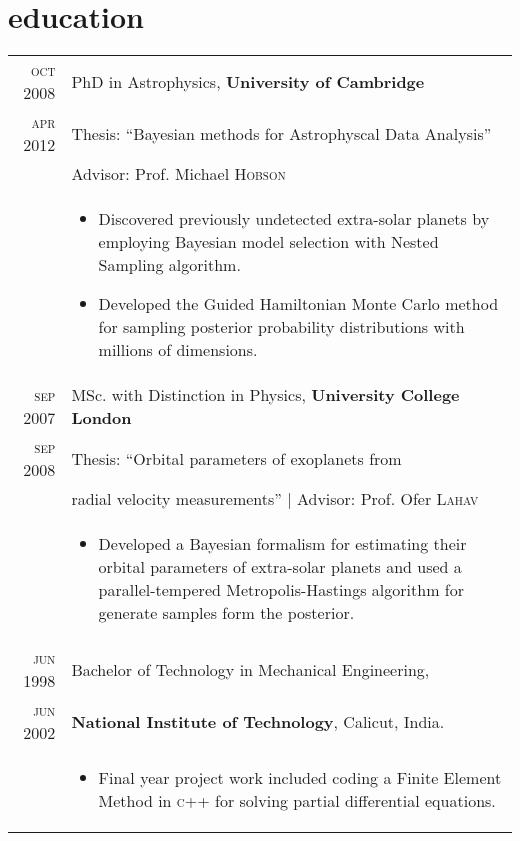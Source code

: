 \documentclass[a4paper,10pt]{article}
\begin{document}
\section{education}
\begin{tabular}{r|p{11cm}}
\textsc{oct 2008} & PhD in Astrophysics, \textbf{University of Cambridge}\\
\textsc{apr 2012} & Thesis: ``Bayesian methods for Astrophyscal Data Analysis'' \\
& \small Advisor: Prof. Michael \textsc{Hobson}\\
&\small{
  \begin{itemize}
    \item Discovered previously undetected extra-solar planets by employing Bayesian model selection
    with Nested Sampling algorithm.
    \item Developed the Guided Hamiltonian Monte Carlo method for sampling posterior probability distributions
    with millions of dimensions.
  \end{itemize}
}\\
\textsc{sep 2007} & MSc. with Distinction in Physics, \textbf{University College London}\\
\textsc{sep 2008} & Thesis: ``Orbital parameters of exoplanets from \\ & radial velocity measurements''
| \small Advisor: Prof. Ofer \textsc{Lahav}\\
&\small{
\begin{itemize}
  \item Developed a Bayesian formalism for estimating their orbital parameters of extra-solar planets and used a
  parallel-tempered Metropolis-Hastings algorithm for generate samples form the posterior.
\end{itemize}
}\\

\textsc{jun 1998} & Bachelor of Technology in Mechanical Engineering, \\
\textsc{jun 2002} &\textbf{National Institute of Technology}, Calicut, India. \\
&\small{
\begin{itemize}
  \item Final year project work included coding a Finite Element Method in \textsc{c++} for solving partial
  differential equations.
\end{itemize}
}
\end{tabular}
\end{document}
